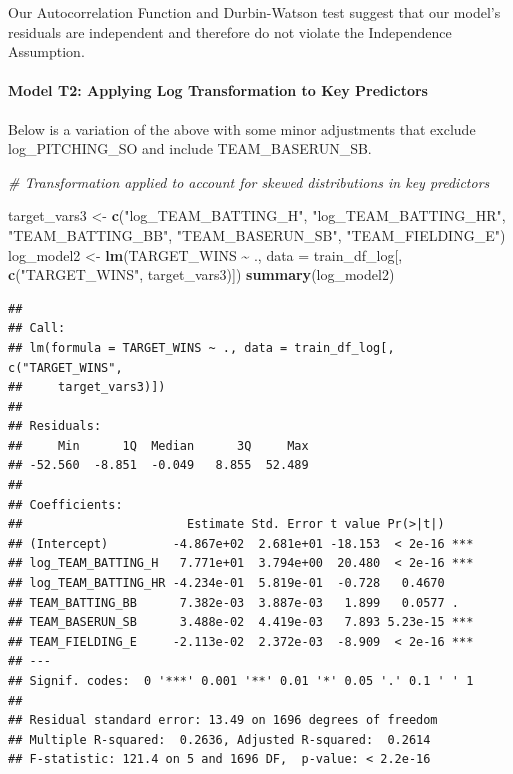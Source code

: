 \documentclass[
]{article}
\newenvironment{Shaded}{\begin{snugshade}}{\end{snugshade}}
\newcommand{\AttributeTok}[1]{\textcolor[rgb]{0.13,0.29,0.53}{#1}}
\newcommand{\CommentTok}[1]{\textcolor[rgb]{0.56,0.35,0.01}{\textit{#1}}}
\newcommand{\FunctionTok}[1]{\textcolor[rgb]{0.13,0.29,0.53}{\textbf{#1}}}
\newcommand{\NormalTok}[1]{#1}
\newcommand{\OtherTok}[1]{\textcolor[rgb]{0.56,0.35,0.01}{#1}}
\newcommand{\SpecialCharTok}[1]{\textcolor[rgb]{0.81,0.36,0.00}{\textbf{#1}}}
\newcommand{\StringTok}[1]{\textcolor[rgb]{0.31,0.60,0.02}{#1}}
\begin{document}
Our Autocorrelation Function and Durbin-Watson test suggest that our
model's residuals are independent and therefore do not violate the
Independence Assumption.

\paragraph{Model T2: Applying Log Transformation to Key
Predictors}\label{model-t2-applying-log-transformation-to-key-predictors}

Below is a variation of the above with some minor adjustments that
exclude log\_PITCHING\_SO and include TEAM\_BASERUN\_SB.

\begin{Shaded}
\begin{Highlighting}[]
\CommentTok{\# Transformation applied to account for skewed distributions in key predictors}

\NormalTok{target\_vars3 }\OtherTok{\textless{}{-}} \FunctionTok{c}\NormalTok{(}\StringTok{"log\_TEAM\_BATTING\_H"}\NormalTok{, }\StringTok{"log\_TEAM\_BATTING\_HR"}\NormalTok{, }\StringTok{"TEAM\_BATTING\_BB"}\NormalTok{, }\StringTok{"TEAM\_BASERUN\_SB"}\NormalTok{, }\StringTok{"TEAM\_FIELDING\_E"}\NormalTok{)}
\NormalTok{log\_model2 }\OtherTok{\textless{}{-}} \FunctionTok{lm}\NormalTok{(TARGET\_WINS }\SpecialCharTok{\textasciitilde{}}\NormalTok{ ., }\AttributeTok{data =}\NormalTok{ train\_df\_log[, }\FunctionTok{c}\NormalTok{(}\StringTok{"TARGET\_WINS"}\NormalTok{, target\_vars3)])}
\FunctionTok{summary}\NormalTok{(log\_model2)}
\end{Highlighting}
\end{Shaded}

\begin{verbatim}
## 
## Call:
## lm(formula = TARGET_WINS ~ ., data = train_df_log[, c("TARGET_WINS", 
##     target_vars3)])
## 
## Residuals:
##     Min      1Q  Median      3Q     Max 
## -52.560  -8.851  -0.049   8.855  52.489 
## 
## Coefficients:
##                       Estimate Std. Error t value Pr(>|t|)    
## (Intercept)         -4.867e+02  2.681e+01 -18.153  < 2e-16 ***
## log_TEAM_BATTING_H   7.771e+01  3.794e+00  20.480  < 2e-16 ***
## log_TEAM_BATTING_HR -4.234e-01  5.819e-01  -0.728   0.4670    
## TEAM_BATTING_BB      7.382e-03  3.887e-03   1.899   0.0577 .  
## TEAM_BASERUN_SB      3.488e-02  4.419e-03   7.893 5.23e-15 ***
## TEAM_FIELDING_E     -2.113e-02  2.372e-03  -8.909  < 2e-16 ***
## ---
## Signif. codes:  0 '***' 0.001 '**' 0.01 '*' 0.05 '.' 0.1 ' ' 1
## 
## Residual standard error: 13.49 on 1696 degrees of freedom
## Multiple R-squared:  0.2636, Adjusted R-squared:  0.2614 
## F-statistic: 121.4 on 5 and 1696 DF,  p-value: < 2.2e-16
\end{verbatim}
\end{document}
